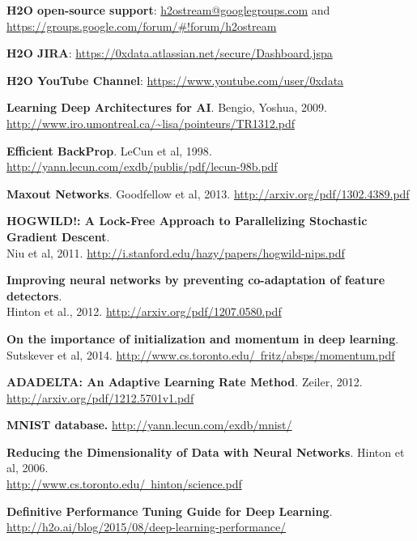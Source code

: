\textbf{H2O open-source support}:   {\url{h2ostream@googlegroups.com} and \url{https://groups.google.com/forum/#!forum/h2ostream}}

\textbf{H2O JIRA}: {\url{https://0xdata.atlassian.net/secure/Dashboard.jspa}}

\textbf{H2O YouTube Channel}: {\url{https://www.youtube.com/user/0xdata}}

\textbf{Learning Deep Architectures for AI}. Bengio, Yoshua, 2009. \\
 {\url{http://www.iro.umontreal.ca/~lisa/pointeurs/TR1312.pdf}}

\textbf{Efficient BackProp}.  {LeCun et al, 1998}. {\url{http://yann.lecun.com/exdb/publis/pdf/lecun-98b.pdf}}

\textbf{Maxout Networks}. {Goodfellow et al, 2013}.  {\url{http://arxiv.org/pdf/1302.4389.pdf}}

\textbf{HOGWILD!: A Lock-Free Approach to Parallelizing Stochastic Gradient Descent}.  \\
{Niu et al, 2011}.  {\url{http://i.stanford.edu/hazy/papers/hogwild-nips.pdf}}

\textbf{Improving neural networks by preventing co-adaptation of feature detectors}.  \\
{Hinton et al., 2012}.  \href{http://arxiv.org/pdf/1207.0580.pdf}{http://arxiv.org/pdf/1207.0580.pdf}

\textbf{On the importance of initialization and momentum in deep learning}.  {Sutskever et al, 2014}.  \href{http://www.cs.toronto.edu/~fritz/absps/momentum.pdf}{http://www.cs.toronto.edu/~fritz/absps/momentum.pdf}

\textbf{ADADELTA: An Adaptive Learning Rate Method}. {Zeiler, 2012}.  \\
 \href{http://arxiv.org/pdf/1212.5701v1.pdf}{http://arxiv.org/pdf/1212.5701v1.pdf}

\textbf{{MNIST database.}}  \href{http://yann.lecun.com/exdb/mnist/}{http://yann.lecun.com/exdb/mnist/}

\textbf{Reducing the Dimensionality of
Data with Neural Networks}.  {Hinton et al, 2006}. \\
 \href{http://www.cs.toronto.edu/~hinton/science.pdf}{http://www.cs.toronto.edu/~hinton/science.pdf}

\textbf{Definitive Performance Tuning Guide for Deep Learning}. \href{http://h2o.ai/blog/2015/08/deep-learning-performance/}{http://h2o.ai/blog/2015/08/deep-learning-performance/}






